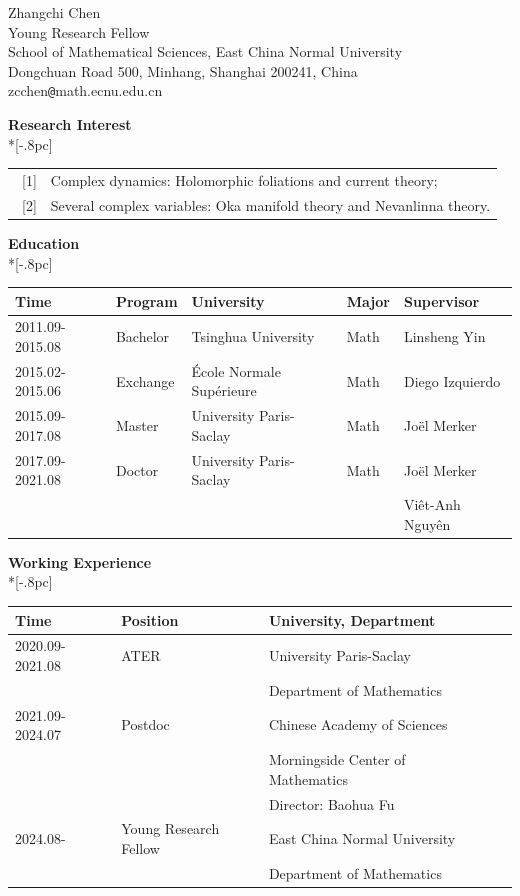 \documentclass[12pt]{article}
\begin{document}
\begin{center}
{\Large Zhangchi Chen} \\[.5pc]
Young Research Fellow\\
School of Mathematical Sciences, East China Normal University\\
Dongchuan Road 500, Minhang, Shanghai 200241, China\\
zcchen\verb|@|math.ecnu.edu.cn
\end{center}

\medskip

{\large \bf Research Interest} \\*[-.8pc]
\underline{\hspace{6.6in}} \\
\begin{tabular}{ll}
~[1] & Complex dynamics: Holomorphic foliations and current theory;\\
~[2] & Several complex variables: Oka manifold theory and Nevanlinna theory.
\end{tabular}

\medskip

{\large \bf Education} \\*[-.8pc]
\underline{\hspace{6.6in}} \\
\begin{tabular}{lllll}
Time & Program & University & Major & Supervisor\\\hline
2011.09-2015.08 & Bachelor & Tsinghua University & Math &  Linsheng Yin\\\hline
2015.02-2015.06 & Exchange & \'Ecole Normale Sup\'erieure & Math &Diego Izquierdo\\\hline
2015.09-2017.08 & Master & University Paris-Saclay & Math & Jo\"el Merker\\\hline
2017.09-2021.08 & Doctor & University Paris-Saclay & Math & Jo\"el Merker\\
& & & & Vi\^et-Anh Nguy\^en\\\hline
\end{tabular}

\medskip

{\large \bf Working Experience} \\*[-.8pc]
\underline{\hspace{6.6in}} \\
\begin{tabular}{lllll}
Time & Position & University, Department \\\hline
2020.09-2021.08 & ATER & University Paris-Saclay\\
& & Department of Mathematics \\\hline
2021.09-2024.07 & Postdoc & Chinese Academy of Sciences\\
& &  Morningside Center of Mathematics\\
& &  Director: Baohua Fu\\\hline
2024.08- & Young Research Fellow & East China Normal University \\
& & Department of Mathematics\\\hline
\end{tabular}
\end{document}
